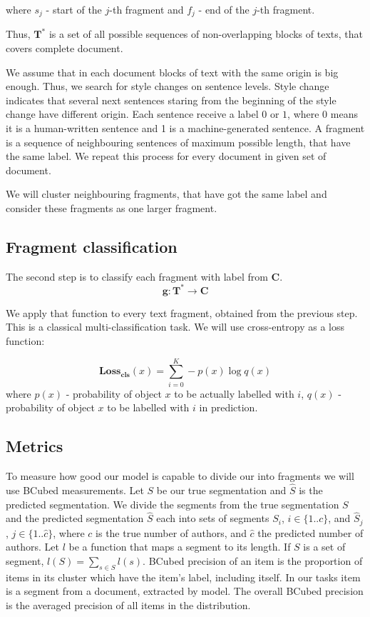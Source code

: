 \documentclass{article}
\begin{document}
where $s_j$ - start of the $j$-th fragment and $f_j$ - end of the $j$-th fragment.

Thus, $\mathbf{T}^*$ is a set of all possible sequences of non-overlapping blocks of texts, that covers complete document.

We assume that in each document blocks of text with the same origin is big enough. Thus, we search for style changes on sentence levels. Style change indicates that several next sentences staring from the beginning of the style change have different origin. Each sentence receive a label $0$ or $1$, where 0 means it is a human-written sentence and 1 is a machine-generated sentence. A fragment is a sequence of neighbouring sentences of maximum possible length, that have the same label. We repeat this process for every document in given set of document. 

We will cluster neighbouring fragments, that have got the same label and consider these fragments as one larger fragment. 

\subsection{Fragment classification}

The second step is to classify each fragment with label from $\mathbf{C}$.
$$\mathbf{g}: \mathbf{T}^* \rightarrow \mathbf{C}$$

We apply that function to every text fragment, obtained from the previous step. This is a classical multi-classification task. We will use cross-entropy as a loss function:

$$\mathbf{Loss_{cls}}(x) = \sum_{i=0}^K-p(x)\log q(x)$$ 
where $p(x)$ - probability of object $x$ to be actually labelled with $i$,
$q(x)$ -  probability of object $x$ to be labelled with $i$  in prediction.

\subsection{Metrics}

To measure how good our model is capable to divide our into fragments we will use BCubed\cite{bcubed} measurements.
Let $S$ be our true segmentation and $\hat{S}$  is the predicted segmentation. We divide the segments from the true segmentation $S$ and the predicted segmentation $\hat{S}$ each into sets of segments $S_i$, $i\in\{1..c\}$, and $\hat{S}_j$, $j\in\{1..\hat{c}\}$, where $c$ is the true number of authors, and $\hat{c}$ the predicted number of authors. Let $l$ be a function that maps a segment to its length. If $S$ is a set of segment, $l(S) = \sum_{s \in S}l(s)$. BCubed precision of an item is the proportion of items in its cluster which have the item’s label, including itself. In our tasks item is a segment from a document, extracted by model. The overall BCubed precision is the averaged precision of all items in the distribution.  
\end{document}
